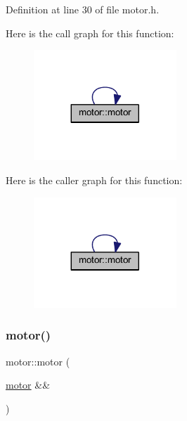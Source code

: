 Definition at line 30 of file motor.\+h.

Here is the call graph for this function\+:
\nopagebreak
\begin{figure}[H]
\begin{center}
\leavevmode
\includegraphics[width=152pt]{classmotor_a9c01c3708164e16c70e1140011d308e4_cgraph}
\end{center}
\end{figure}
Here is the caller graph for this function\+:
\nopagebreak
\begin{figure}[H]
\begin{center}
\leavevmode
\includegraphics[width=152pt]{classmotor_a9c01c3708164e16c70e1140011d308e4_icgraph}
\end{center}
\end{figure}
\mbox{\label{classmotor_a69ca4e0bdf735ca324b2a64a555613e6}} 
\subsubsection{\texorpdfstring{motor()}{motor()}\hspace{0.1cm}{\footnotesize\ttfamily [3/4]}}
{\footnotesize\ttfamily motor\+::motor (\begin{DoxyParamCaption}\item[{\mbox{\hyperlink{classmotor}{motor}} \&\&}]{ }\end{DoxyParamCaption})\hspace{0.3cm}{\ttfamily [default]}}

\mbox{\label{classmotor_a95429da99ca065a6ba2dd9fd823a83f2}} 

